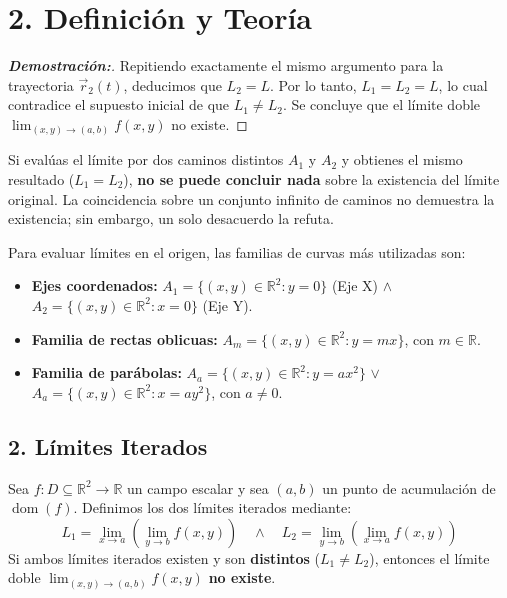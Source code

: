 \documentclass[11pt]{article}
\newenvironment{teoria}{%
  \section*{2. Definición y Teoría}%
}{}
\newenvironment{teorema}[1]{%
  \begin{tcolorbox}[colback=green!5,colframe=green!75!black,title=Teorema: #1]%
}{%
  \end{tcolorbox}%
}
\newenvironment{alerta}[1]{%
  \begin{tcolorbox}[colback=yellow!10,colframe=orange!80!black,title=Alerta: #1]%
}{%
  \end{tcolorbox}%
}
\newenvironment{procesamiento}[1]{%
  \begin{tcolorbox}[colback=gray!5,colframe=gray!60!black,title=Procedimiento: #1]%
}{%
  \end{tcolorbox}%
}
\begin{document}
\begin{teoria}
\begin{proof}[\textbf{Demostración:}]
    Repitiendo exactamente el mismo argumento para la trayectoria $\vec{r}_2(t)$, deducimos que $L_2 = L$. Por lo tanto, $L_1 = L_2 = L$, lo cual contradice el supuesto inicial de que $L_1 \neq L_2$.
    Se concluye que el límite doble $\displaystyle\lim_{(x,y) \to (a,b)} f(x,y)$ no existe.
  \end{proof}

  \begin{alerta}{Observación Fundamental sobre Caminos}
    Si evalúas el límite por dos caminos distintos $A_1$ y $A_2$ y obtienes el mismo resultado ($L_1 = L_2$), \textbf{no se puede concluir nada} sobre la existencia del límite original. La coincidencia sobre un conjunto infinito de caminos no demuestra la existencia; sin embargo, un solo desacuerdo la refuta.
  \end{alerta}

  \begin{procesamiento}{Caminos Usuales de Aproximación al {$(0,0)$}}
    Para evaluar límites en el origen, las familias de curvas más utilizadas son:
    \begin{itemize}
      \item \textbf{Ejes coordenados:} $A_1 = \{ (x,y) \in \mathbb{R}^2 \colon y = 0 \}$ (Eje X) $\wedge$ $A_2 = \{ (x,y) \in \mathbb{R}^2 \colon x = 0 \}$ (Eje Y).
      \item \textbf{Familia de rectas oblicuas:} $A_m = \{ (x,y) \in \mathbb{R}^2 \colon y = mx \}$, con $m \in \mathbb{R}$.
      \item \textbf{Familia de parábolas:} $A_a = \{ (x,y) \in \mathbb{R}^2 \colon y = ax^2 \}$ $\vee$ $A_a = \{ (x,y) \in \mathbb{R}^2 \colon x = ay^2 \}$, con $a \neq 0$.
    \end{itemize}
  \end{procesamiento}

  \subsection*{2. Límites Iterados}
  
  \begin{teorema}{Criterio de Inexistencia por Límites Iterados}
    Sea $f \colon D \subseteq \mathbb{R}^2 \to \mathbb{R}$ un campo escalar y sea $(a,b)$ un punto de acumulación de $\operatorname{dom}(f)$. Definimos los dos límites iterados mediante:
    $$ L_1 = \displaystyle\lim_{x \to a} \left( \displaystyle\lim_{y \to b} f(x,y) \right) \quad \wedge \quad L_2 = \displaystyle\lim_{y \to b} \left( \displaystyle\lim_{x \to a} f(x,y) \right) $$
    Si ambos límites iterados existen y son \textbf{distintos} ($L_1 \neq L_2$), entonces el límite doble $\displaystyle\lim_{(x,y) \to (a,b)} f(x,y)$ \textbf{no existe}.
  \end{teorema}


\end{teoria}
\end{document}
